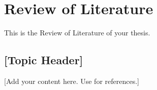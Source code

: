 \chapter{Review of Literature}
\label{chap:reviewofliterature}

This is the Review of Literature of your thesis.

\section{[Topic Header]}
[Add your content here. Use \cite{sample} for references.]
